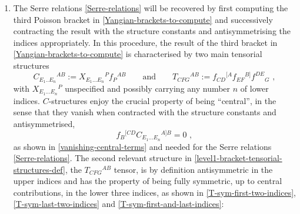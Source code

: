 \documentclass[12pt]{article}
\numberwithin{equation}{section}
\begin{document}
\begin{enumerate}
\begin{equation}
\begin{aligned}
\\
\chi^{(0)}(-\sigma_{1})&=\beta s\int_{-\sigma_{1}}^{+\sigma_{2}}\!\!\!\!\!\!\!\!\!\!\mathrm{d}\sigma' \, \theta(-\sigma_{1}\!-\!\sigma')B_{\tau}(\sigma')=0 \,\, ,
\end{aligned}
\end{equation}
since $\sigma'\in[-\sigma_{1},+\sigma_{2}]$ and hence $\theta(\sigma_{2}-\sigma')=1 $ for all $\sigma'$ and $\theta(-\sigma_{1}-\sigma')=0$ for all $\sigma'$. 
These relations connect the charge $Q^{(0)}$ to the value of the potential $\chi^{(0)}$ at the boundaries, which should ultimately be sent to infinity, leading to
\begin{equation}\label{relation-charges-potential}
Q^{(0)}=s\chi^{(0)}(+\infty) 
\qquad \text{and} \qquad 
\chi^{(0)}(-\infty) = 0 \,\, .
\end{equation}
\item The Serre relations \eqref{Serre-relations} will be recovered by first computing the third Poisson bracket in \eqref{Yangian-brackets-to-compute} and successively contracting the result with the structure constants and antisymmetrising the indices appropriately. In this procedure, the result of the third bracket in \eqref{Yangian-brackets-to-compute} is characterised by two main tensorial structures
\begin{equation}\label{level1-bracket-tensorial-structures-def}
C_{E_{1}..E_{n}}{}^{AB}:=X_{E_{1}...E_{n}}{}^{P}f_{P}{}^{AB}
\qquad \text{and} \qquad
T_{CFG}{}^{AB}:=f_{CD}{}^{[A}f_{EF}{}^{B]}f^{DE}{}_{G}
 \,\, ,
\end{equation}
with $X_{E_{1}...E_{n}}{}^{P}$ unspecified and possibly carrying any number $n$ of lower indices. $C$-structures enjoy the crucial property of being ``central'', in the sense that they vanish when contracted with the structure constants and antisymmetrised,
\begin{equation}\label{central-tensors-def}
f_{B}{}^{[CD}C_{E_{1}...E_{n}}{}^{A]B}=0 \,\, ,
\end{equation}
as shown in \eqref{vanishing-central-terms} and needed for the Serre relations \eqref{Serre-relations}. The second relevant structure in \eqref{level1-bracket-tensorial-structures-def}, the $T_{CFG}{}^{AB}$ tensor, is by definition antisymmetric in the upper indices and has the property of being fully symmetric, up to central contributions, in the lower three indices, as shown in  \eqref{T-sym-first-two-indices}, \eqref{T-sym-last-two-indices} and \eqref{T-sym-first-and-last-indices}:
\begin{equation}\label{T-symmetry}

\end{equation}
\end{enumerate}
\end{document}
